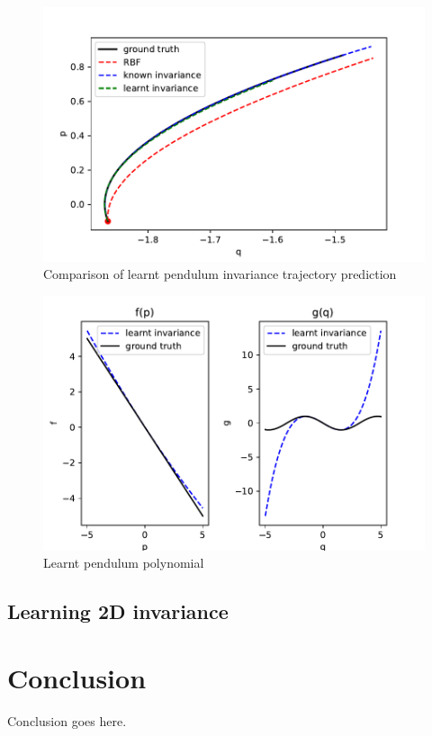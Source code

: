 \documentclass{statsmsc}
\begin{document}
\begin{figure}[H] 
  \includegraphics[width=0.6\linewidth]{../codes/figures/parameterised_pendulum_predicted_trajectory.pdf}
  \centering
  \caption{Comparison of learnt pendulum invariance trajectory prediction}
  \label{fig:parameterised_pendulum_trajectory}
\end{figure}

\begin{figure}[H] 
  \includegraphics[width=0.6\linewidth]{../codes/figures/parameterised_pendulum_learnt_polynomial.pdf}
  \centering
  \caption{Learnt pendulum polynomial}
  \label{fig:parameterised_pendulum_polynomial}
\end{figure}

\section{Learning 2D invariance}




\chapter{Conclusion}


Conclusion goes here. 






%
%
\end{document}
